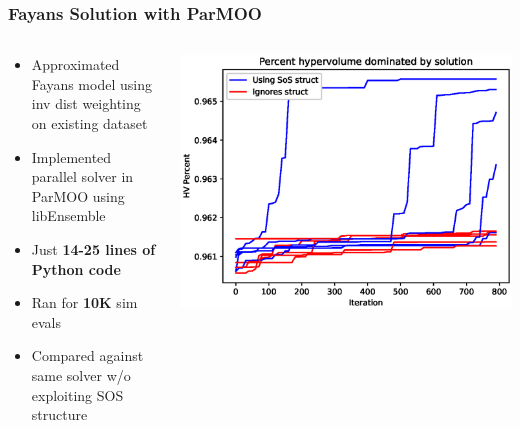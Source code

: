 \documentclass[aspectratio=169]{beamer}
\begin{document}
\begin{frame}\frametitle{Fayans Solution with ParMOO}
\begin{columns}
\begin{column}{0.5\textwidth}
\begin{itemize}
\item Approximated Fayans model using inv dist weighting on existing dataset
\item {\color{blue}
Implemented parallel solver in ParMOO} using libEnsemble
\item Just {\bf 14-25 lines of Python code}
\item Ran for {\bf 10K} sim evals
\item Compared against
{\color{red} same solver w/o exploiting SOS structure}
\end{itemize}
\end{column}
\begin{column}{0.5\textwidth}
\includegraphics[width=\textwidth]{hv_1.eps}
\end{column}
\end{columns}
\end{frame}
\end{document}

